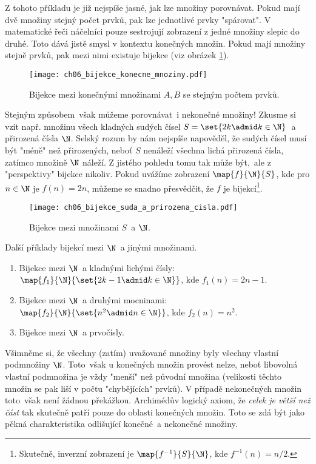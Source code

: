 Z tohoto příkladu je již nejspíše jasné, jak lze množiny porovnávat. Pokud mají dvě množiny stejný počet prvků, pak lze jednotlivé prvky "spárovat". V matematické řeči náčelníci pouze sestrojují zobrazení z jedné množiny slepic do druhé. Toto dává jistě smysl v kontextu konečných množin. Pokud mají množiny stejně prvků, pak mezi nimi existuje bijekce (viz obrázek \ref{fig:bijekce_konecne_mnoziny}).
\begin{figure}[h]
    \centering
    \texttt{[image: ch06\_bijekce\_konecne\_mnoziny.pdf]}
    \caption{Bijekce mezi konečnými množinami $A,B$ se stejným počtem prvků.}
    \label{fig:bijekce_konecne_mnoziny}
\end{figure}
Stejným způsobem~však můžeme porovnávat~i nekonečné množiny! Zkusme si vzít např. množinu všech kladných sudých čísel $S=\set{2k\admid k\in\N}$~a přirozená čísla $\N$. Selský rozum by nám nejspíše napověděl, že sudých čísel musí být "méně" než přirozených, neboť $S$ nenáleží všechna lichá přirozená čísla, zatímco množině $\N$ náleží. Z jistého pohledu tomu tak může být,~ale z "perspektivy" bijekce nikoliv. Pokud uvážíme zobrazení $\map{f}{\N}{S}$, kde pro $n\in\N$ je $f(n)=2n$, můžeme se snadno přesvědčit, že $f$ je bijekcí\footnote{Skutečně, inverzní zobrazení je $\map{f^{-1}}{S}{\N}$, kde $f^{-1}(n)=n/2$.}.
\begin{figure}[h]
    \centering
    \texttt{[image: ch06\_bijekce\_suda\_a\_prirozena\_cisla.pdf]}
    \caption{Bijekce mezi množinami $S$~a $\N$.}
    \label{fig:bijekce_suda_a_prirozena_cisla}
\end{figure}
\begin{example}\label{ex:bijekce_prirozena_cisla}
    Další příklady bijekcí mezi $\N$~a jinými množinami.
    \begin{enumerate}[label=(\roman*)]
        \item Bijekce mezi $\N$~a kladnými lichými čísly: $\map{f_1}{\N}{\set{2k-1\admid k\in\N}}$, kde $f_1(n)=2n-1$.
        \item Bijekce mezi $\N$~a druhými mocninami: $\map{f_2}{\N}{\set{n^2\admid n\in\N}}$, kde $f_2(n)=n^2$.
        \item Bijekce mezi $\N$~a prvočísly.
    \end{enumerate}
\end{example}
Všimněme si, že všechny (zatím) uvažované množiny byly všechny vlastní podmnožiny $\N$. Toto~však u konečných množin provést nelze, neboť libovolná vlastní podmnožina je vždy "menší" než původní množina (velikosti těchto množin se pak liší v počtu "chybějících" prvků). V případě nekonečných množin toto~však není žádnou překážkou. Archimédův logický axiom, že \emph{celek je větší než část} tak skutečně patří pouze do oblasti konečných množin. Toto se zdá být jako pěkná charakteristika odlišující konečné~a nekonečné množiny.\par
